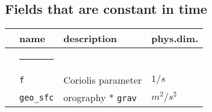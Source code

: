 \subsection{Fields that are constant in time}  
\begin{tabular}{l l l l}  
& \parbox{.15\textwidth}{name} & \parbox{.65\textwidth}{description} & 
\parbox{.1\textwidth}{phys.dim.} \\ \hline  
& \rule{4ex}{0pt} & \\[-10pt]  
& \texttt{f}   & Coriolis parameter & $1/s$ \\  
& \texttt{geo\_sfc}   & orography * \texttt{grav} & $m^2/s^2$ \\  
\end{tabular}  
  
